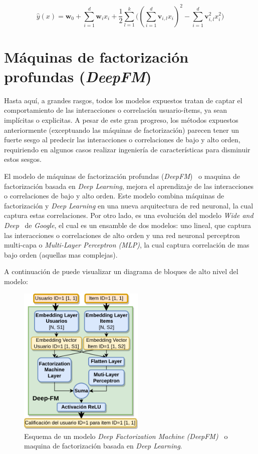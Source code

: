 \documentclass[11pt,a4paper,twoside]{thesis}
\begin{document}
\begin{equation}
	\hat{y}(x) = \mathbf{w}_0 + \sum_{i=1}^d \mathbf{w}_i x_i + \frac{1}{2} \sum_{l=1}^k \big ((\sum_{i=1}^d \mathbf{v}_{i, l} x_i)^2 - \sum_{i=1}^d \mathbf{v}_{i, l}^2 x_i^2)
\end{equation}

\clearpage

\section{Máquinas de factorización profundas (\textit{DeepFM})}

Hasta aquí, a grandes rasgos, todos los modelos expuestos tratan de captar el
comportamiento de las interacciones o correlación usuario-ítems, ya sean
implícitas o explicitas. A pesar de este gran progreso, los métodos expuestos
anteriormente (exceptuando las máquinas de factorización) parecen tener un
fuerte sesgo al predecir las interacciones o correlaciones de bajo y alto
orden, requiriendo en algunos casos realizar ingeniería de características
para disminuir estos sesgos.

El modelo de máquinas de factorización profundas
(\textit{DeepFM})~\cite{dfmpaper, didldfm} o maquina de factorización basada en
\textit{Deep Learning}, mejora el aprendizaje de las interacciones o
correlaciones de bajo y alto orden. Este modelo combina máquinas de
factorización y \textit{Deep Learning} en una nueva arquitectura de red
neuronal, la cual captura estas correlaciones. Por otro lado, es una evolución
del modelo \textit{Wide and Deep}~\cite{wideanddeeppaper} de \textit{Google},
el cual es un ensamble de dos modelos: uno lineal, que captura las
interacciones o correlaciones de alto orden y una red neuronal perceptron
multi-capa o \textit{Multi-Layer Perceptron (MLP)}, la cual captura correlación
de mas bajo orden (aquellas mas complejas).

A continuación de puede visualizar un diagrama de bloques de alto nivel del
modelo:

\begin{figure}[h!]
	\centering
	\includegraphics[width=6cm]{./images/Deep-MF.png}
	\caption{
		Esquema de un modelo \textit{Deep Factorization Machine (DeepFM)~\cite{dfmpaper, didldfm}} o maquina
		de factorización basada en \textit{Deep Learning}.
	}
	\label{fig:DeepMFModel}
\end{figure}
\end{document}
